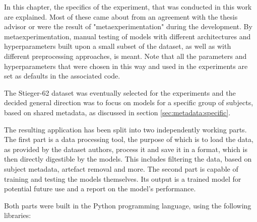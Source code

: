 \documentclass[english, he, bc, kiv, iso690alph, viewonly]{fasthesis}
\begin{document}
In this chapter, the specifics of the experiment, that was conducted in this work are explained. Most of these came about from an agreement with the thesis advisor or were the result of "metaexperimentation" during the development. By metaexperimentation, manual testing of models with different architectures and hyperparameters built upon a small subset of the dataset, as well as with different preprocessing approaches, is meant. Note that all the parameters and hyperparameters that were chosen in this way and used in the experiments are set as defaults in the associated code.

The Stieger-62 dataset was eventually selected for the experiments and the decided general direction was to focus on models for a specific group of subjects, based on shared metadata, as discussed in section \ref{sec:metadata:specific}.

The resulting application has been split into two independently working parts. The first part is a data processing tool, the purpose of which is to load the data, as provided by the dataset authors, process it and save it in a format, which is then directly digestible by the models. This includes filtering the data, based on subject metadata, artefact removal and more. The second part is capable of training and testing the models themselves. Its output is a trained model for potential future use and a report on the model's performance.

Both parts were built in the Python programming language, using the following libraries:
\end{document}
